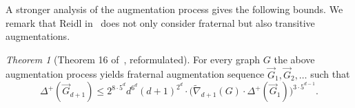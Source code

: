 \documentclass[1p,number,a4paper]{elsarticle}
\theoremstyle{remark}
\newtheorem{theorem}{Theorem}[section]
\newtheorem{lemma}[theorem]{Lemma}
\begin{document}




%


A stronger analysis of the augmentation process gives the
following bounds. We remark that Reidl in~\cite{Reidl16} does not only consider fraternal but also transitive augmentations.  

\begin{theorem}[Theorem 16 of~\cite{Reidl16}, reformulated]
For every graph $G$ the above augmentation process yields fraternal 
augmentation sequence $\vec G_1, \vec G_2,\ldots$
such that 
\[\Delta^+(\vec{G}_{d+1})\leq 2^{8\cdot 5^d}d^{6^d}(d+1)^{2^d}
\cdot \big(\widetilde{\nabla}_{d+1}(G)\cdot \Delta^+(\vec G_1)\big)
^{3\cdot 5^{d-1}}.\] 
\end{theorem}

\end{document}
